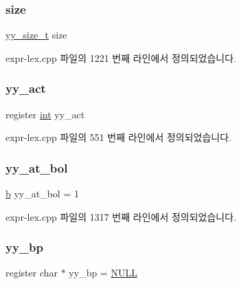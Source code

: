 \subsubsection{\texorpdfstring{size}{size}}
{\footnotesize\ttfamily \mbox{\hyperlink{expr-lex_8cpp_aa14cc3d400000eef0cd40225fd790cfe}{yy\+\_\+size\+\_\+t}} size}



expr-\/lex.\+cpp 파일의 1221 번째 라인에서 정의되었습니다.

\mbox{\label{expr-lex_8cpp_a7ffc8c947830757dd87ad202a6823edd}} 
\subsubsection{\texorpdfstring{yy\+\_\+act}{yy\_act}}
{\footnotesize\ttfamily register \mbox{\hyperlink{_util_8cpp_a0ef32aa8672df19503a49fab2d0c8071}{int}} yy\+\_\+act}



expr-\/lex.\+cpp 파일의 551 번째 라인에서 정의되었습니다.

\mbox{\label{expr-lex_8cpp_adef6ed71d4cd59407dc44578f94e5fec}} 
\subsubsection{\texorpdfstring{yy\+\_\+at\+\_\+bol}{yy\_at\_bol}}
{\footnotesize\ttfamily \mbox{\hyperlink{expr-lex_8cpp_a91b64995742fd30063314f12340b4b5a}{b}} yy\+\_\+at\+\_\+bol = 1}



expr-\/lex.\+cpp 파일의 1317 번째 라인에서 정의되었습니다.

\mbox{\label{expr-lex_8cpp_a71cf769ce518e8687bf8999b278c65f4}} 
\subsubsection{\texorpdfstring{yy\+\_\+bp}{yy\_bp}}
{\footnotesize\ttfamily register char $\ast$ yy\+\_\+bp = \mbox{\hyperlink{_system_8h_a070d2ce7b6bb7e5c05602aa8c308d0c4}{N\+U\+LL}}}



